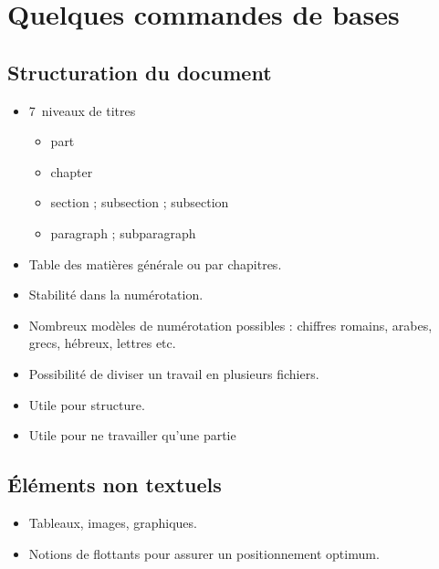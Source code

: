\section{Quelques commandes de bases}

\subsection{Structuration du document}

\begin{slide}
  \begin{itemize}
    \item 7~niveaux de titres
      \begin{itemize}
	\item part
	\item chapter
	\item section ; subsection ; subsection
	\item paragraph ; subparagraph
      \end{itemize}
    \item Table des matières générale ou par chapitres.
    \item Stabilité dans la numérotation.
    \item Nombreux modèles de numérotation possibles : chiffres romains, arabes, grecs, hébreux, lettres etc.
  \end{itemize}
\end{slide}
\begin{slide}
\begin{itemize}
  \item Possibilité de diviser un travail en plusieurs fichiers.
  \item Utile pour structure.
  \item Utile pour ne travailler qu'une partie
\end{itemize}
\end{slide}
\subsection{Éléments non textuels}

\begin{slide}
  \begin{itemize}
    \item Tableaux, images, graphiques.
    \item Notions de flottants pour assurer un positionnement optimum.
  \end{itemize}
\end{slide}

